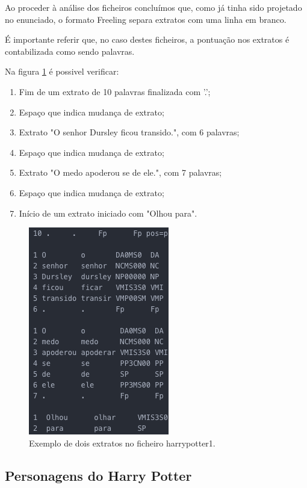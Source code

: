 \documentclass[11pt,a4paper]{report}
\begin{document}
Ao proceder à análise dos ficheiros concluímos que, como já tinha sido projetado no enunciado, o formato Freeling separa extratos com uma linha em branco.

É importante referir que, no caso destes ficheiros, a pontuação nos extratos é contabilizada como sendo palavras.

\vspace{0.5cm}

Na figura \ref{img:analise1} é possivel verificar:

\begin{enumerate}
 \item Fim de um extrato de 10 palavras finalizada com '.';
 \item Espaço que indica mudança de extrato;
 \item Extrato "O senhor Dursley ficou transido.", com 6 palavras;
 \item Espaço que indica mudança de extrato;
 \item Extrato "O medo apoderou se de ele.", com 7 palavras;
 \item Espaço que indica mudança de extrato;
 \item Início de um extrato iniciado com "Olhou para".
\end{enumerate}

\begin{figure}[H]
\centering
\includegraphics[scale=0.6]{analise1.png}
\caption{Exemplo de dois extratos no ficheiro harrypotter1.}
\label{img:analise1}
\end{figure}

\subsection{Personagens do Harry Potter}
\label{subsec:analise2}
\end{document}
